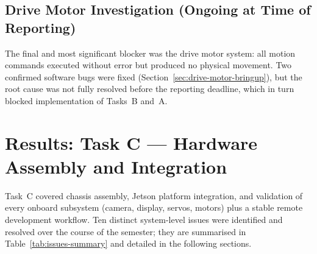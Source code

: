 \documentclass{imc-inf}
\begin{document}
\section{Drive Motor Investigation (Ongoing at Time of Reporting)}
\label{sec:motor-investigation}

The final and most significant blocker was the drive motor system: all motion commands
executed without error but produced no physical movement. Two confirmed software bugs
were fixed (Section~\ref{sec:drive-motor-bringup}), but the root cause was not fully
resolved before the reporting deadline, which in turn blocked implementation of
Tasks~B and~A.

\chapter{Results: Task C --- Hardware Assembly and Integration}
\label{chap:task-c}

Task~C covered chassis assembly, Jetson platform integration, and validation of
every onboard subsystem (camera, display, servos, motors) plus a stable remote
development workflow. Ten distinct system-level issues were identified and resolved
over the course of the semester; they are summarised in Table~\ref{tab:issues-summary}
and detailed in the following sections.
\end{document}
